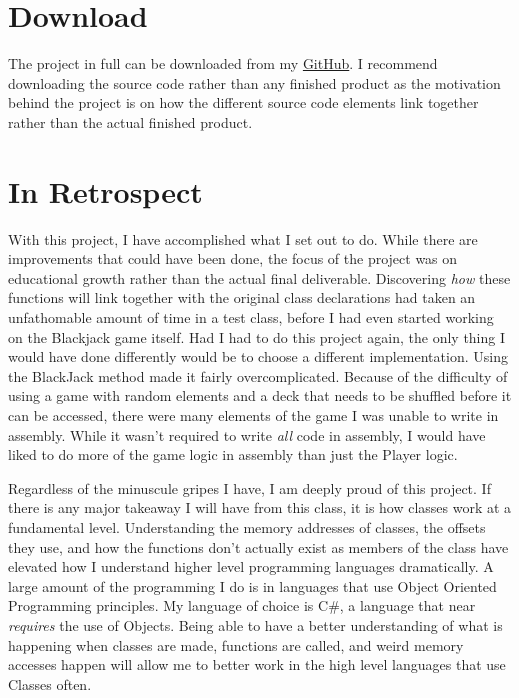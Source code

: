 \documentclass[twoside]{article}
\begin{document}
    \section{Download}\label{sec:download}
    The project in full can be downloaded from my \href{https://github.com/AKonicki26/CSI-370}{GitHub}.
    I recommend downloading the source code rather than any finished product as the motivation behind the project is on how the different source code elements link together rather than the actual finished product.

    \section{In Retrospect}
    With this project, I have accomplished what I set out to do.
    While there are improvements that could have been done, the focus of the project was on educational growth rather than the actual final deliverable.
    Discovering \emph{how} these functions will link together with the original class declarations had taken an unfathomable amount of time in a test class, before I had even started working on the Blackjack game itself.
    Had I had to do this project again, the only thing I would have done differently would be to choose a different implementation.
    Using the BlackJack method made it fairly overcomplicated.
    Because of the difficulty of using a game with random elements and a deck that needs to be shuffled before it can be accessed, there were many elements of the game I was unable to write in assembly.
    While it wasn't required to write \emph{all} code in assembly, I would have liked to do more of the game logic in assembly than just the Player logic.

    \bigbreak
    \noindent
    Regardless of the minuscule gripes I have, I am deeply proud of this project.
    If there is any major takeaway I will have from this class, it is how classes work at a fundamental level.
    Understanding the memory addresses of classes, the offsets they use, and how the functions don't actually exist as members of the class have elevated how I understand higher level programming languages dramatically.
    A large amount of the programming I do is in languages that use Object Oriented Programming principles.
    My language of choice is C#, a language that near \emph{requires} the use of Objects.
    Being able to have a better understanding of what is happening when classes are made, functions are called, and weird memory accesses happen will allow me to better work in the high level languages that use Classes often.
\end{document}

